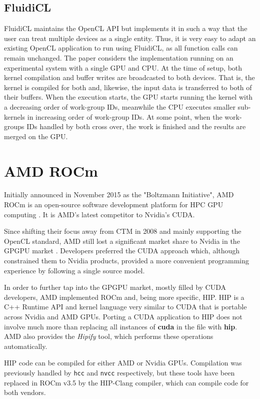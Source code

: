 \subsection{FluidiCL}
FluidiCL \cite{fluidicl} maintains the OpenCL API but implements it in such a way that the user can treat multiple devices as a single entity. Thus, it is very easy to adapt an existing OpenCL application to run using FluidiCL, as all function calls can remain unchanged. The paper considers the implementation running on an experimental system with a single GPU and CPU. At the time of setup, both kernel compilation and buffer writes are broadcasted to both devices. That is, the kernel is compiled for both and, likewise, the input data is transferred to both of their buffers. When the execution starts, the GPU starts running the kernel with a decreasing order of work-group IDs, meanwhile the CPU executes smaller sub-kernels in increasing order of work-group IDs. At some point, when the work-groups IDs handled by both cross over, the work is finished and the results are merged on the GPU.

\section{AMD ROCm} \label{sect:rocm}
Initially announced in November 2015 as the "Boltzmann Initiative", AMD ROCm is an open-source software development platform for HPC GPU computing \cite{boltzmann_initiative}. It is AMD's latest competitor to Nvidia's CUDA.

Since shifting their focus away from CTM in 2008 and mainly supporting the OpenCL standard, AMD still lost a significant market share to Nvidia in the GPGPU market \cite{amd_as_alternative}. Developers preferred the CUDA approach which, although constrained them to Nvidia products, provided a more convenient programming experience by following a single source model.

In order to further tap into the GPGPU market, mostly filled by CUDA developers, AMD implemented ROCm and, being more specific, HIP. HIP is a C++ Runtime API and kernel language very similar to CUDA that is portable across Nvidia and AMD GPUs. Porting a CUDA application to HIP does not involve much more than replacing all instances of \textbf{cuda} in the file with \textbf{hip}. AMD also provides the \textit{Hipify} tool, which performs these operations automatically.

HIP code can be compiled for either AMD or Nvidia GPUs. Compilation was previously handled by \texttt{hcc} and \texttt{nvcc} respectively, but these tools have been replaced in ROCm v3.5 by the HIP-Clang compiler, which can compile code for both vendors.

